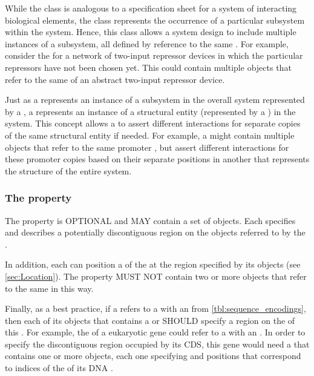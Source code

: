 While the  class is analogous to a specification sheet for a system of interacting biological elements, the  class represents the occurrence of a particular subsystem within the system.
Hence, this class allows a system design to include multiple instances of a subsystem, all defined by reference to the same .
For example, consider the  for a network of two-input repressor devices in which the particular repressors have not been chosen yet. This  could contain multiple  objects that refer to the same  of an abstract two-input repressor device.

Just as a  represents an instance of a subsystem in the overall system represented by a  , a  represents an instance of a structural entity (represented by a ) in the system. This concept allows a  to assert different interactions for separate copies of the same structural entity if needed. For example, a  might contain multiple   objects that refer to the same promoter , but assert different interactions for these promoter copies based on their separate positions in another  that represents the structure of the entire system.

\subsubsection*{The  property}
\label{sec:feature}

The  property is OPTIONAL and MAY contain a set of  objects. Each  specifies and describes a potentially discontiguous region on the  objects referred to by the .

In addition, each  can  position a  of the  at the region specified by its  objects (see \ref{sec:Location}). 
The  property MUST NOT contain two or more  objects that refer to the same  in this way.

Finally, as a best practice, if a  refers to a  with an   from \ref{tbl:sequence_encodings}, then each of its  objects that contains a  or  SHOULD specify a region on the  of this .
For example, the  of a eukaryotic gene could refer to a  with an  . In order to specify the discontiguous region occupied by its CDS, this gene  would need a  that contains one or more  objects, each one specifying  and  positions that correspond to indices of the  of its DNA .

